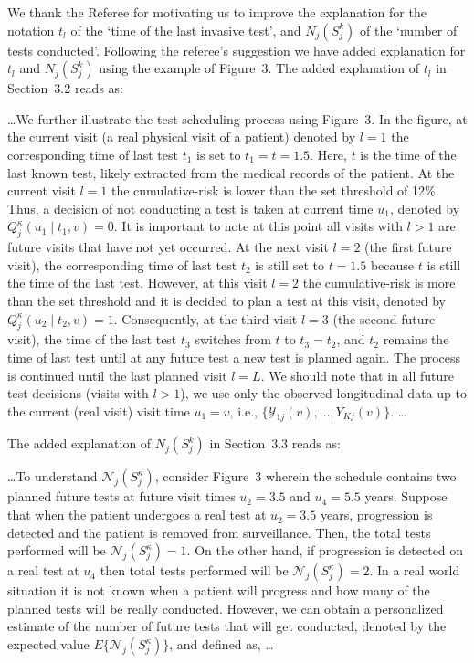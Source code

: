 \begin{enumerate}
We thank the Referee for motivating us to improve the explanation for the notation $t_l$ of the `time of the last invasive test', and $N_j(S^k_j)$ of the `number of tests conducted'. Following the referee's suggestion we have added explanation for $t_l$ and $N_j(S^k_j)$ using the example of Figure~3. The added explanation of $t_l$ in Section~3.2 reads as:
\begin{shadequote}
\ldots We further illustrate the test scheduling process using Figure~3. In the figure, at the current visit (a real physical visit of a patient) denoted by $l=1$ the corresponding time of last test $t_1$ is set to $t_1 = t =1.5$. Here, $t$ is the time of the last known test, likely extracted from the medical records of the patient. At the current visit $l=1$ the cumulative-risk is lower than the set threshold of 12\%. Thus, a decision of not conducting a test is taken at current time $u_1$, denoted by $Q_j^\kappa (u_1 \mid t_1, v) = 0$. It is important to note at this point all visits with $l>1$ are future visits that have not yet occurred. At the next visit $l=2$ (the first future visit), the corresponding time of last test $t_2$ is still set to $t=1.5$ because $t$ is still the time of the last test. However, at this visit $l=2$ the cumulative-risk is more than the set threshold and it is decided to plan a test at this visit, denoted by $Q_j^\kappa (u_2 \mid t_2, v) = 1$. Consequently, at the third visit $l=3$ (the second future visit), the time of the last test $t_3$ switches from $t$ to $t_3 = t_2$, and $t_2$ remains the time of last test until at any future test a new test is planned again. The process is continued until the last planned visit $l=L$. We should note that in all future test decisions (visits with $l > 1$), we use only the observed longitudinal data up to the current (real visit) visit time $u_1 = v$, i.e., $\{\mathcal Y_{1j}(v), \ldots, Y_{Kj}(v)\}$. \ldots
\end{shadequote}

The added explanation of $N_j(S^k_j)$ in Section~3.3 reads as:
\begin{shadequote}
\ldots To understand $\mathcal{N}_j (S^\kappa_j)$, consider Figure~3 wherein the schedule contains two planned future tests at future visit times $u_2 = 3.5$ and $u_4 = 5.5$ years. Suppose that when the patient undergoes a real test at $u_2 = 3.5$ years, progression is detected and the patient is removed from surveillance. Then, the total tests performed will be $\mathcal{N}_j (S^\kappa_j) = 1$. On the other hand, if progression is detected on a real test at $u_4$ then total tests performed will be $\mathcal{N}_j (S^\kappa_j) = 2$. In a real world situation it is not known when a patient will progress and how many of the planned tests will be really conducted. However, we can obtain a personalized estimate of the number of future tests that will get conducted, denoted by the expected value $E \big \{\mathcal N_j(S^\kappa_j)\big\}$, and defined as, \ldots
\end{shadequote}


\end{enumerate}
